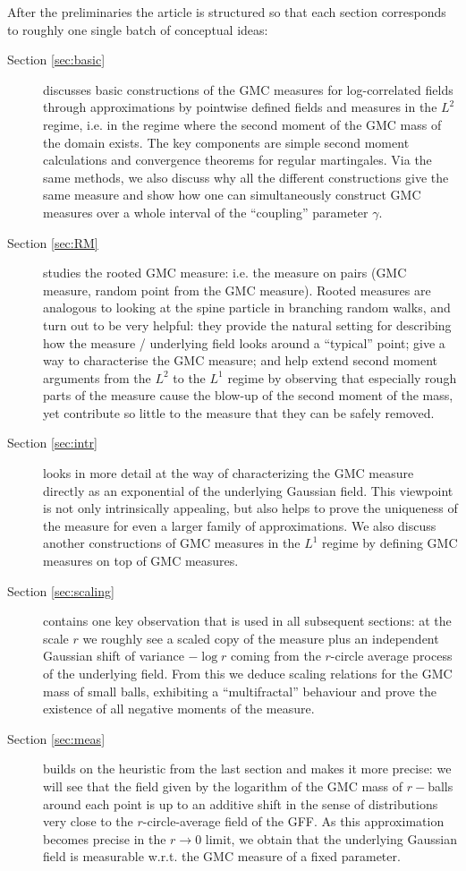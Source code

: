 \documentclass[11pt]{amsart}
\renewcommand{\1}{\mathbf 1}
\begin{document}
After the preliminaries the article is structured so that each section corresponds to roughly one single batch of conceptual ideas:
\begin{description}
\item [Section \ref{sec:basic}] discusses basic constructions of the GMC measures for log-correlated fields through approximations by pointwise defined fields and measures in the $L^2$ regime, i.e. in the regime where the second moment of the GMC mass of the domain exists. The key components are simple second moment calculations and convergence theorems for regular martingales. Via the same methods, we also discuss why all the different constructions give the same measure and show how one can simultaneously construct GMC measures over a whole interval of the ``coupling'' parameter $\gamma$.
\item [Section \ref{sec:RM}] studies the rooted GMC measure: i.e. the measure on pairs (GMC measure, random point from the GMC measure). Rooted measures are analogous to looking at the spine particle in branching random walks, and turn out to be very helpful: they provide the natural setting for describing how the measure / underlying field looks around a ``typical'' point; give a way to characterise the GMC measure; and help extend second moment arguments from the $L^2$ to the $L^1$ regime by observing that especially rough parts of the measure cause the blow-up of the second moment of the mass, yet contribute so little to the measure that they can be safely removed.
\item [Section \ref{sec:intr}] looks in more detail at the way of characterizing the GMC measure directly as an exponential of the underlying Gaussian field. This viewpoint is not only intrinsically appealing, but also helps to prove the uniqueness of the measure for even a larger family of approximations. We also discuss another constructions of GMC measures in the $L^1$ regime by defining GMC measures on top of GMC measures.
\item [Section \ref{sec:scaling}] contains one key observation that is used in all subsequent sections: at the scale $r$ we roughly see a scaled copy of the measure plus an independent Gaussian shift of variance $-\log r$ coming from the $r$-circle average process of the underlying field. From this we deduce scaling relations for the GMC mass of small balls, exhibiting a ``multifractal'' behaviour and prove the existence of all negative moments of the measure.
\item [Section \ref{sec:meas}] builds on the heuristic from the last section and makes it more precise: we will see that the field given by the logarithm of the GMC mass of $r-$balls around each point is up to an additive shift in the sense of distributions very close to the $r$-circle-average field of the GFF. As this approximation becomes precise in the $r \to 0$ limit, we obtain that the underlying Gaussian field is measurable w.r.t. the GMC measure of a fixed parameter.

\end{description}
\end{document}
